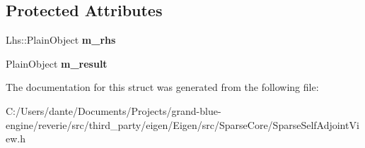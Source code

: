 \subsection*{Protected Attributes}
\begin{DoxyCompactItemize}
\item 
\mbox{\label{struct_eigen_1_1internal_1_1product__evaluator_3_01_product_3_01_lhs_00_01_rhs_view_00_01_defaule3daa34d3e750fc1a34e5c28fcdbf893_a664df6e0b5e025a271abf13e578a1891}} 
Lhs\+::\+Plain\+Object {\bfseries m\+\_\+rhs}
\item 
\mbox{\label{struct_eigen_1_1internal_1_1product__evaluator_3_01_product_3_01_lhs_00_01_rhs_view_00_01_defaule3daa34d3e750fc1a34e5c28fcdbf893_a9ee467faa607703707826695f5f86b1b}} 
Plain\+Object {\bfseries m\+\_\+result}
\end{DoxyCompactItemize}


The documentation for this struct was generated from the following file\+:\begin{DoxyCompactItemize}
\item 
C\+:/\+Users/dante/\+Documents/\+Projects/grand-\/blue-\/engine/reverie/src/third\+\_\+party/eigen/\+Eigen/src/\+Sparse\+Core/Sparse\+Self\+Adjoint\+View.\+h\end{DoxyCompactItemize}
